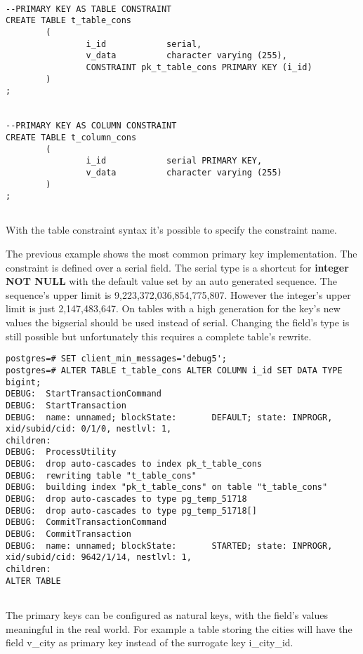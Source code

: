 \begin{lstlisting}[style=pgsql]

--PRIMARY KEY AS TABLE CONSTRAINT
CREATE TABLE t_table_cons
        (
                i_id            serial,
                v_data          character varying (255),
                CONSTRAINT pk_t_table_cons PRIMARY KEY (i_id)
        )
;


--PRIMARY KEY AS COLUMN CONSTRAINT
CREATE TABLE t_column_cons
        (
                i_id            serial PRIMARY KEY,
                v_data          character varying (255)
        )
;


\end{lstlisting}

With the table constraint syntax it's possible to specify the constraint name.\newline

The previous example shows the most common primary key implementation. The constraint is defined over a
serial field. The serial type is a shortcut for \textbf{integer NOT NULL} with the default
value set by an auto generated sequence. The sequence's upper limit is 9,223,372,036,854,775,807.
However the integer's upper limit is just 2,147,483,647. On tables with a high generation for the key's
new values the bigserial should be used instead of serial. Changing the field's
type is still possible but unfortunately this requires a complete table's rewrite.\newline


\begin{lstlisting}[style=pgsql]
postgres=# SET client_min_messages='debug5';
postgres=# ALTER TABLE t_table_cons ALTER COLUMN i_id SET DATA TYPE  bigint;
DEBUG:  StartTransactionCommand
DEBUG:  StartTransaction
DEBUG:  name: unnamed; blockState:       DEFAULT; state: INPROGR, xid/subid/cid: 0/1/0, nestlvl: 1,
children:
DEBUG:  ProcessUtility
DEBUG:  drop auto-cascades to index pk_t_table_cons
DEBUG:  rewriting table "t_table_cons"
DEBUG:  building index "pk_t_table_cons" on table "t_table_cons"
DEBUG:  drop auto-cascades to type pg_temp_51718
DEBUG:  drop auto-cascades to type pg_temp_51718[]
DEBUG:  CommitTransactionCommand
DEBUG:  CommitTransaction
DEBUG:  name: unnamed; blockState:       STARTED; state: INPROGR, xid/subid/cid: 9642/1/14, nestlvl: 1,
children:
ALTER TABLE


\end{lstlisting}

The primary keys can be configured as natural keys, with the field's values meaningful in the real
world. For example a table storing the cities will have the field v\_city as primary key instead of
the surrogate key i\_city\_id.


